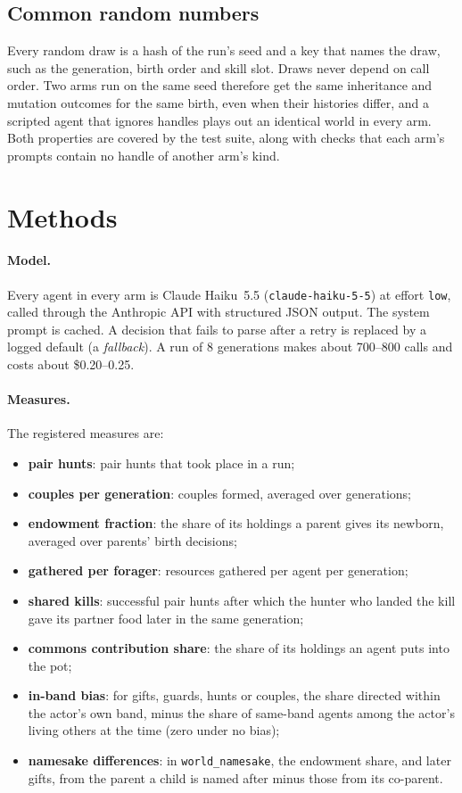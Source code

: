 \documentclass[11pt]{article}
\newcommand{\arm}[1]{\texttt{#1}}
\begin{document}
\subsection{Common random numbers}

Every random draw is a hash of the run's seed and a key that names the draw, such as the
generation, birth order and skill slot. Draws never depend on call order. Two arms run on the same
seed therefore get the same inheritance and mutation outcomes for the same birth, even when their
histories differ, and a scripted agent that ignores handles plays out an identical world in every
arm. Both properties are covered by the test suite, along with checks that each arm's prompts
contain no handle of another arm's kind.

\section{Methods}
\label{sec:methods}

\paragraph{Model.} Every agent in every arm is Claude Haiku~5.5 (\texttt{claude-haiku-5-5}) at
effort \texttt{low}, called through the Anthropic API with structured JSON output. The system
prompt is cached. A decision that fails to parse after a retry is replaced by a logged default
(a \emph{fallback}). A run of 8 generations makes about 700--800 calls and costs about \$0.20--0.25.

\paragraph{Measures.} The registered measures are:
\begin{itemize}
  \item \textbf{pair hunts}: pair hunts that took place in a run;
  \item \textbf{couples per generation}: couples formed, averaged over generations;
  \item \textbf{endowment fraction}: the share of its holdings a parent gives its newborn, averaged
        over parents' birth decisions;
  \item \textbf{gathered per forager}: resources gathered per agent per generation;
  \item \textbf{shared kills}: successful pair hunts after which the hunter who landed the kill
        gave its partner food later in the same generation;
  \item \textbf{commons contribution share}: the share of its holdings an agent puts into the pot;
  \item \textbf{in-band bias}: for gifts, guards, hunts or couples, the share directed within the
        actor's own band, minus the share of same-band agents among the actor's living others at
        the time (zero under no bias);
  \item \textbf{namesake differences}: in \arm{world\_namesake}, the endowment share, and later
        gifts, from the parent a child is named after minus those from its co-parent.
\end{itemize}
\end{document}
